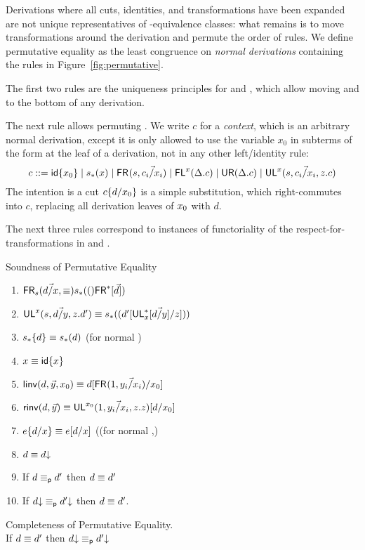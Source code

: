 Derivations where all cuts, identities, and transformations have been
expanded are not unique representatives of \deq-equivalence classes:
what remains is to move transformations around the derivation and
permute the order of rules.  We define permutative equality as the least
congruence on \emph{normal derivations} containing the rules in
Figure~\ref{fig:permutative}.

The first two rules are the uniqueness principles for \Fsymb\/ and
\Usymb\/, which allow moving \FL\/ and \UR\/ to the bottom of any
derivation.  

The next rule allows permuting \UL.  We write $c$ for a \emph{context},
which is an arbitrary normal derivation, except it is only allowed to
use the variable $x_0$ in subterms of the form  at the leaf
of a derivation, not in any other left/identity rule:
\[
c ::= {\mathsf{id}\{x_0\}} \mid s_*(x) \mid \mathsf{FR}_{}(s,\vec{c_i/x_i}) \mid \mathsf{FL}^{x}(\Delta.c) \mid \mathsf{UR}(\Delta.c) \mid \mathsf{UL}^{x}_{}(s,\vec{c_i/x_i},z.c)
\]
The intention is a cut $c\{d/x_0\}$ is a simple substitution,
which right-commutes into $c$, replacing all derivation leaves of
${x_0}$ with $d$.  

The next three rules correspond to instances of
functoriality of the respect-for-transformations in \UL\/ and \FR\/.

\begin{conjecture}{Soundness of Permutative Equality} \label{thm:permutative-soundess}
\begin{enumerate}
\item $\mathsf{FR}_{s}(\vec{d/x},\equiv) s_*(()\mathsf{FR}^*[\vec{d}])$
\item $\mathsf{UL}^{x}_{}(s,\vec{d/y},z.d') \equiv s_*((d'[\mathsf{UL}^*_{x}[\vec{d/y}]/z]))$
\item $s_*\{d\} \equiv s_*(d)$ (for normal \D)
\item $x \equiv {\ensuremath{\mathsf{id}}\{x\}}$
\item $\mathsf{linv}(d,\vec{y},x_0) \equiv d[\mathsf{FR}_{}(1,\vec{y_i/x_i})/x_0]$
\item $\mathsf{rinv}(d,\vec{y}) \equiv \mathsf{UL}^{x_0}_{}(1,\vec{y_i/x_i},z.z)[d/x_0]$
\item $e\{d/x\} \equiv e[d/x]$ ((for normal \D,\E)
\item $d \equiv d\mathord{\downarrow}$
\item If $d \equiv_{\mathsf{p}} d'$ then $d \equiv d'$
\item If $d\mathord{\downarrow} \equiv_{\mathsf{p}} d'\mathord{\downarrow}$ then $d \equiv d'$.  
\end{enumerate}
\end{conjecture}

\begin{conjecture}{Completeness of Permutative Equality.}\\ \label{thm:permutative-completeness}
If $d \equiv d'$ then $d\mathord{\downarrow} \equiv_{\mathsf{p}} d'\mathord{\downarrow}$
\end{conjecture}

